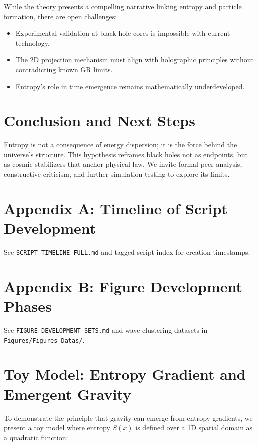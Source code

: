 \documentclass[12pt]{article}
\begin{document}
While the theory presents a compelling narrative linking entropy and particle formation, there are open challenges:

\begin{itemize}
    \item Experimental validation at black hole cores is impossible with current technology.
    \item The 2D projection mechanism must align with holographic principles without contradicting known GR limits.
    \item Entropy's role in time emergence remains mathematically underdeveloped.
\end{itemize}

\section{Conclusion and Next Steps}

Entropy is not a consequence of energy dispersion; it is the force behind the universe's structure. This hypothesis reframes black holes not as endpoints, but as cosmic stabilizers that anchor physical law. We invite formal peer analysis, constructive criticism, and further simulation testing to explore its limits.

\appendix

\section{Appendix A: Timeline of Script Development}

See \texttt{SCRIPT\_TIMELINE\_FULL.md} and tagged script index for creation timestamps.

\section{Appendix B: Figure Development Phases}

See \texttt{FIGURE\_DEVELOPMENT\_SETS.md} and wave clustering datasets in \texttt{Figures/Figures~Datas/}.

\tableofcontents

\section{Toy Model: Entropy Gradient and Emergent Gravity}

To demonstrate the principle that gravity can emerge from entropy gradients, we present a toy model where entropy \( S(x) \) is defined over a 1D spatial domain as a quadratic function:
\end{document}

